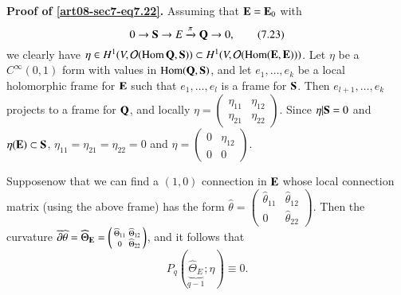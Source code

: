 \noindent
{\bf Proof of \eqref{art08-sec7-eq7.22}.} Assuming that $\mathbf{E}=\mathbf{E}_{0}$ with
\begin{equation*}
0\to \mathbf{S}\to E\xrightarrow{\pi}\mathbf{Q}\to 0,\tag{7.23}\label{art08-sec7-eq7.23}
\end{equation*}
we clearly have $\eta\in H^{1}(V,\mathcal{O}(\operatorname{\mathrm{Hom}} \mathbf{Q},\mathbf{S}))\subset H^{1}(V,\mathcal{O}(\operatorname{\mathrm{Hom}}(\mathbf{E},\mathbf{E})))$. Let $\eta$ be a $C^{\infty}(0,1)$ form with values in $\operatorname{\mathrm{Hom}}(\mathbf{Q},\mathbf{S})$, and let $e_{1},\ldots,e_{k}$ be a local holomorphic frame for $\mathbf{E}$ such that $e_{1},\ldots,e_{l}$ is a frame for $\mathbf{S}$. Then $e_{l+1},\ldots,e_{k}$ projects to a frame for $\mathbf{Q}$, and locally $\eta=\left(\begin{smallmatrix} \eta_{11} & \eta_{12}\\ \eta_{21} & \eta_{22}\end{smallmatrix}\right)$. Since $\eta|\mathbf{S}=0$ and $\eta(\mathbf{E})\subset \mathbf{S}$, $\eta_{11}=\eta_{21}=\eta_{22}=0$ and $\eta=\left(\begin{smallmatrix} 0 & \eta_{12}\\ 0 & 0\end{smallmatrix}\right)$.

Suppose\pageoriginale now that we can find a $(1,0)$ connection in $\mathbf{E}$ whose local connection matrix (using the above frame) has the form $\widehat{\theta}=\left(\begin{smallmatrix} \widehat{\theta}_{11} & \widehat{\theta}_{12}\\ 0 & \widehat{\theta}_{22}\end{smallmatrix}\right)$. Then the curvature $\overline{\partial}\widehat{\theta}=\widehat{\Theta}_{\mathbf{E}}=\left(\begin{smallmatrix} \widehat{\Theta}_{11} & \widehat{\Theta}_{12}\\ 0 & \widehat{\Theta}_{22}\end{smallmatrix}\right)$, and it follows that 
$$
P_{q}(\underbrace{\widehat{\Theta}_{E}}_{q-1};\eta)\equiv 0.
$$

